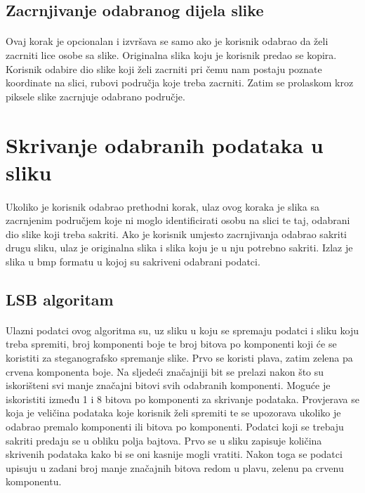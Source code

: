 \documentclass[times, utf8, seminar, numeric]{fer}
\begin{document}
\subsection{Zacrnjivanje odabranog dijela slike}
\paragraph{}
Ovaj korak je opcionalan i izvršava se samo ako je korisnik odabrao da želi zacrniti lice osobe sa slike. Originalna slika koju je korisnik predao se kopira. Korisnik odabire dio slike koji želi zacrniti pri čemu nam postaju poznate koordinate na slici, rubovi područja koje treba zacrniti. Zatim se prolaskom kroz piksele slike zacrnjuje odabrano područje.
\section{Skrivanje odabranih podataka u sliku}
\paragraph{}
Ukoliko je korisnik odabrao prethodni korak, ulaz ovog koraka je slika sa zacrnjenim područjem koje ni moglo identificirati osobu na slici te taj, odabrani dio slike koji treba sakriti. Ako je korisnik umjesto zacrnjivanja odabrao sakriti drugu sliku, ulaz je originalna slika i slika koju je u nju potrebno sakriti. Izlaz je slika u bmp formatu u kojoj su sakriveni odabrani podatci.
\subsection{LSB algoritam}
\paragraph{}
Ulazni podatci ovog algoritma su, uz sliku u koju se spremaju podatci i sliku koju treba spremiti, broj komponenti boje te broj bitova po komponenti koji će se koristiti za steganografsko spremanje slike. Prvo se koristi plava, zatim zelena pa crvena komponenta boje. Na sljedeći značajniji bit se prelazi nakon što su iskorišteni svi manje značajni bitovi svih odabranih komponenti. Moguće je iskoristiti između 1 i 8 bitova po komponenti za skrivanje podataka. Provjerava se koja je veličina podataka koje korisnik želi spremiti te se upozorava ukoliko je odabrao premalo komponenti ili bitova po komponenti.
Podatci koji se trebaju sakriti predaju se u obliku polja bajtova. Prvo se u sliku zapisuje količina skrivenih podataka kako bi se oni kasnije mogli vratiti. Nakon toga se podatci upisuju u zadani broj manje značajnih bitova redom u plavu, zelenu pa crvenu komponentu.
\end{document}
